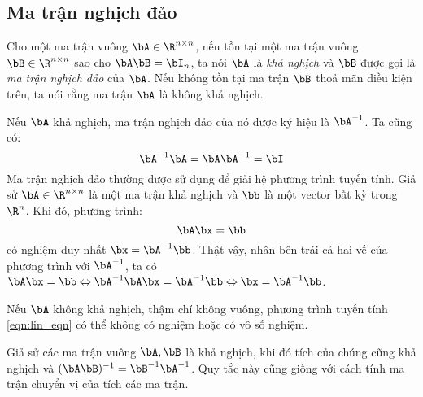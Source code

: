 \subsection{Ma trận nghịch đảo} %
\label{sub:inverse_matrix}

Cho một ma trận vuông $\bA \in \R^{n\times n }$, nếu tồn tại một ma trận vuông
$\bB \in \R^{n\times n}$ sao cho $\bA\bB = \bI_n$, ta nói $\bA$ là \textit{khả
nghịch} và $\bB$ được gọi là \textit{ma trận nghịch đảo} của $\bA$. Nếu không
tồn tại ma trận $\bB$ thoả mãn điều kiện trên, ta nói rằng ma trận $\bA$ là
{không khả nghịch}.

Nếu $\bA$ khả nghịch, ma trận nghịch đảo của nó được ký hiệu là $\bA^{-1}$. Ta
cũng có:
\begin{equation}
    \bA^{-1}\bA = \bA\bA^{-1} = \bI
\end{equation}
Ma trận nghịch đảo thường được sử dụng để giải hệ phương trình tuyến tính. Giả
sử $\bA \in \R^{n\times n}$ là một ma trận khả nghịch và $\bb$ là một vector bất kỳ trong $\R^n$. Khi đó, phương trình:
\begin{equation}
\label{eqn:lin_eqn}
    \bA\bx = \bb
\end{equation}
có nghiệm duy nhất $\bx = \bA^{-1}\bb$. Thật vậy, nhân bên trái cả hai vế của
phương trình với $\bA^{-1}$, ta có $\bA\bx = \bb \Leftrightarrow  \bA^{-1}\bA\bx = \bA^{-1}\bb \Leftrightarrow \bx = \bA^{-1}\bb$.

Nếu $\bA$ không khả nghịch, thậm chí không vuông, phương trình tuyến tính
\eqref{eqn:lin_eqn} có thể không có nghiệm hoặc có vô số nghiệm.

Giả sử các ma trận vuông $\bA, \bB$ là khả nghịch, khi đó tích của chúng cũng
khả nghịch và $(\bA\bB)^{-1} = \bB^{-1}\bA^{-1}$. Quy tắc này cũng giống
với cách tính ma trận chuyển vị của tích các ma trận.


